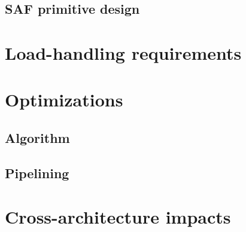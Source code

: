 \subsection{SAF primitive design}
%
%
\section{Load-handling requirements}
%
\section{Optimizations}

\subsection{Algorithm}

\subsection{Pipelining}
%
\section{Cross-architecture impacts}

